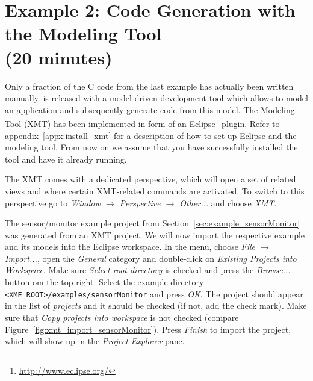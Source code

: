 %
% 
%
%
%

\section[Example 2: Code Generation with the Modeling Tool (30 minutes)]{Example 2: Code Generation with the Modeling Tool\\(20 minutes)}
\label{sec:example_xmt}

Only a fraction of the C code from the last example has actually been written manually.
\xme is released with a model-driven development tool which allows to model an application and subsequently generate code from this model.
The \xme Modeling Tool (XMT) has been implemented in form of an Eclipse\footnote{\url{http://www.eclipse.org/}} plugin.
Refer to appendix~\ref{appx:install_xmt} for a description of how to set up Eclipse and the modeling tool.
From now on we assume that you have successfully installed the tool and have it already running.

The XMT comes with a dedicated perspective, which will open a set of related views and where certain XMT-related commands are activated.
To switch to this perspective go to \textit{Window $\rightarrow$ Perspective $\rightarrow$ Other...} and choose \emph{XMT}.

The sensor/monitor example project from Section~\ref{sec:example_sensorMonitor} was generated from an XMT project.
We will now import the respective example and its models into the Eclipse workspace.
In the menu, choose \textit{File $\rightarrow$ Import...}, open the \emph{General} category and double-click on \emph{Existing Projects into Workspace}.
Make sure \emph{Select root directory} is checked and press the \emph{Browse...} button om the top right.
Select the example directory \verb|<XME_ROOT>/examples/sensorMonitor| and press \emph{OK}.
The project should appear in the list of \emph{projects} and it should be checked (if not, add the check mark).
Make sure that \emph{Copy projects into workspace} is not checked (compare Figure~\ref{fig:xmt_import_sensorMonitor}).
Press \emph{Finish} to import the project, which will show up in the \emph{Project Explorer} pane.


